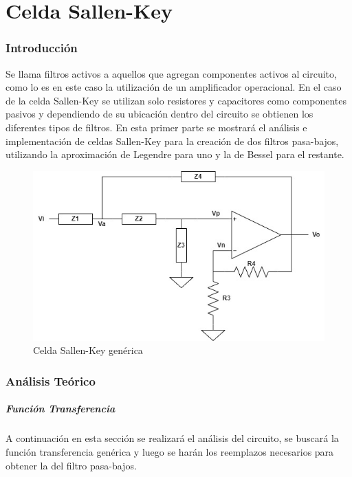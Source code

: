 \part{Celda Sallen-Key} 
\section{Introducción}
	Se llama filtros activos a aquellos que agregan componentes activos al circuito, como lo es en este caso la utilización de un amplificador operacional. En el caso de la celda Sallen-Key se utilizan solo resistores y capacitores como componentes pasivos y dependiendo de su ubicación dentro del circuito se obtienen los diferentes tipos de filtros.
	En esta primer parte se mostrará el análisis e implementación de celdas Sallen-Key para la creación de dos filtros pasa-bajos, utilizando la aproximación de Legendre para uno y la de Bessel para el restante.
	
\begin{figure}[H]
	\centering
	\includegraphics[scale=0.5]{../Ex1/Informe/sallenkeygenerico.jpg}
	\caption{Celda Sallen-Key genérica}
	\label{fig:sallenkeygenerica}
\end{figure}
	
\section{Análisis Teórico}

\subsubsection{Función Transferencia}
	A continuación en esta sección se realizará el análisis del circuito, se buscará la función transferencia genérica y luego se harán los reemplazos necesarios para obtener la del filtro pasa-bajos.
	

